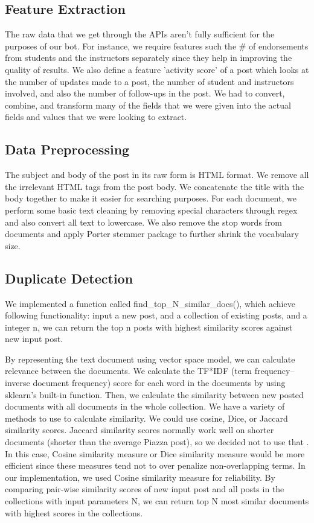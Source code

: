 \documentclass[sigconf]{acmart}
\begin{document}
\subsection{Feature Extraction}
The raw data that we get through the APIs aren't fully sufficient for the purposes of our bot. For instance, we require features such the \# of endorsements from students and the instructors separately since they help in improving the quality of results. We also define a feature 'activity score' of a post which looks at the number of updates made to a post, the number of student and instructors involved, and also the number of follow-ups in the post. We had to convert, combine, and transform many of the fields that we were given into the actual fields and values that we were looking to extract.

\subsection{Data Preprocessing}
The subject and body of the post in its raw form is HTML format. We remove all the irrelevant HTML tags from the post body. We concatenate the title with the body together to make it easier for searching purposes. For each document, we perform some basic text cleaning by removing special characters through regex and also convert all text to lowercase. We also remove the stop words from documents and apply Porter stemmer \cite{porterstem} package to further shrink the vocabulary size. 

\subsection{Duplicate Detection}
We implemented a function called find\_top\_N\_similar\_docs(), which achieve following functionality: input a new post, and a collection of existing posts, and a integer n, we can return the top n posts with highest similarity scores against new input post. 

By representing the text document using vector space model, we can calculate relevance between the documents. We calculate the TF*IDF (term frequency–inverse document frequency) score for each word in the documents by using sklearn's built-in function. Then, we calculate the similarity between new posted documents with all documents in the whole collection. We have a variety of methods to use to calculate similarity. We could use cosine, Dice, or Jaccard similarity scores. Jaccard similarity scores normally work well on shorter documents (shorter than the average Piazza post), so we decided not to use that \cite{tamingtext}. In this case, Cosine similarity measure or Dice similarity measure would be more efficient since these measures tend not to over penalize non-overlapping terms. In our implementation, we used Cosine similarity measure for reliability. By comparing pair-wise similarity scores of new input post and all posts in the collections  with input parameters N, we can return top N most similar documents with highest scores in the collections. 
\end{document}

